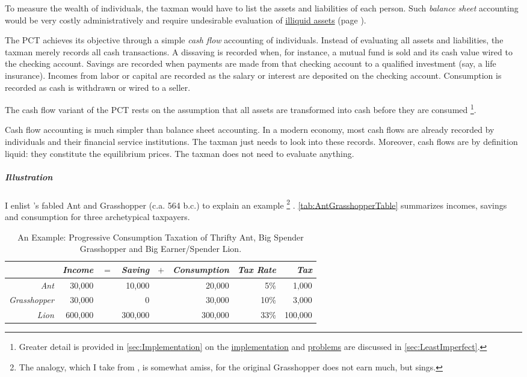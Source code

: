 To measure the wealth of individuals, the taxman would have to list the assets and liabilities of each person.
Such \emph{balance sheet} accounting would be very costly administratively and require undesirable evaluation of \hyperref[des:NoIlliquidAssets]{illiquid assets} (page \pageref{des:NoIlliquidAssets}).

The PCT achieves its objective through a simple \emph{cash flow} accounting of individuals.
Instead of evaluating all assets and liabilities, the taxman merely records all cash transactions.
A dissaving is recorded when, for instance, a mutual fund is sold and its cash value wired to the checking account.
Savings are recorded when payments are made from that checking account to a qualified investment (say, a life insurance).
Incomes from labor or capital are recorded as the salary or interest are deposited on the checking account.
Consumption is recorded as cash is withdrawn or wired to a seller.

The cash flow variant of the PCT rests on the assumption that all assets are transformed into cash before they are consumed
\footnote{
	Greater detail is provided in \autoref{sec:Implementation} on the \hyperref[sec:Implementation]{implementation} and \hyperref[sec:LeastImperfect]{problems} are discussed in \autoref{sec:LeastImperfect}.
}.

Cash flow accounting is much simpler than balance sheet accounting.
In a modern economy, most cash flows are already recorded by individuals and their financial service institutions.
The taxman just needs to look into these records.
Moreover, cash flows are by definition liquid:
they constitute the equilibrium prices.
The taxman does not need to evaluate anything.

\subparagraph{Illustration} I enlist \citeauthor{Aesop}'s fabled Ant and Grasshopper (c.a.
564 b.c.) to explain an example
\footnote{
	The analogy, which I take from \cite{McCaffery2005}, is somewhat amiss, for the original Grasshopper does not earn much, but sings.
}
.
\autoref{tab:AntGrasshopperTable} summarizes incomes, savings and consumption for three archetypical taxpayers.

\begin{table}
	\caption[Example of a Postpaid Progressive Consumption Tax Account]{An Example:
Progressive Consumption Taxation of Thrifty Ant, Big Spender Grasshopper and Big Earner/Spender Lion.}
	\label{tab:AntGrasshopperTable}
	\small
	\begin{center}
	\begin{tabular}{r r r r r r r r}
		\toprule
					 			&\emph{Income}	&$=$	&\emph{Saving}			&$+$	&\emph{Consumption}		&\emph{Tax Rate}		&\emph{Tax}\\
		\midrule
		\emph{Ant}				&30,000			&		&10,000					&		&20,000					&5\%					&1,000\\
		\emph{Grasshopper}	&30,000			&		&0							&		&30,000					&10\%					&3,000\\						\emph{Lion}			&600,000			&		&300,000					&		&300,000					&33\%					&100,000\\
		\bottomrule
	\end{tabular}
	\end{center}
\end{table}

